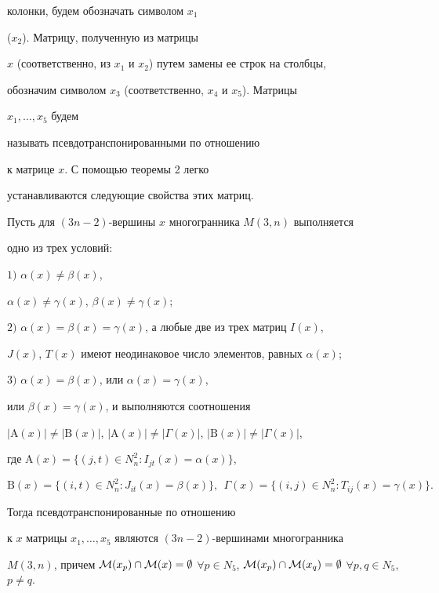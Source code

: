 колонки, будем обозначать символом $x_1$


($x_2$). Матрицу, полученную из матрицы


$x$ (соответственно, из $x_1$ и $x_2$) путем замены ее строк на столбцы,


обозначим символом $x_3$ (соответственно, $x_4$ и $x_5$). Матрицы


$x_1,\dotsc,x_5$ будем 


называть псевдотранспонированными по отношению


к матрице $x$. С помощью теоремы 2 легко 


устанавливаются следующие свойства этих матриц.





\begin{cor}


Пусть для $(3n-2)$-вершины $x$ многогранника $M(3,n)$ выполняется


одно из трех условий:





$1)$ $\alpha(x)\neq \beta(x)$,


$\alpha(x)\neq \gamma(x)$, $\beta(x)\neq \gamma(x)$;





$2)$ $\alpha(x)=\beta(x)=\gamma(x)$, а любые две из трех матриц $I(x)$,


$J(x)$, $T(x)$ имеют неодинаковое число элементов, равных $\alpha(x)$;





$3)$ $\alpha(x)=\beta(x)$, или $\alpha(x)=\gamma(x)$,


или $\beta(x)=\gamma(x)$, и выполняются соотношения


$|\mathrm A(x)|\neq |\mathrm B(x)|$, $|\mathrm A


(x)|\neq |\Gamma(x)|$, $|\mathrm B(x)|\neq |\Gamma(x)|$,


где $\mathrm A(x)=\{


(j,t)\in N^2_n: I_{jt}(x)=\alpha(x)\}$,


$$


\mathrm B(x)=\{(i,t)\in N^2_n: J_{it}(x)


=\beta(x)\},\ \ \Gamma(x)=\{(i,j)\in N^2_n: T_{ij}(x)=\gamma(x)\}.


$$





Тогда псевдотранспонированные по отношению 


к $x$ матрицы $x_1,\dotsc,x_5$ являются $(3n-2)$-вершинами многогранника


$M(3,n)$, причем ${\cal M} (x_p)\cap


{\cal M} (x)=\emptyset$ $\forall p\in N_5$, ${\cal M}(x_p)\cap{\cal M} (x_q)=


\emptyset$ $\forall p,q\in N_5$, $p\neq q$.


\end{cor}





